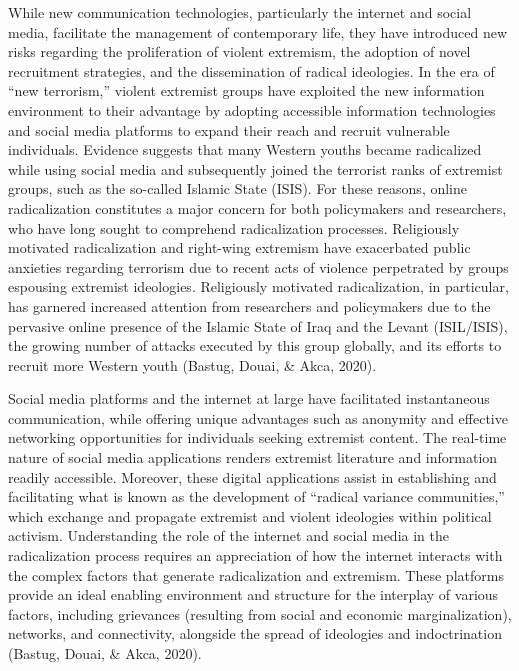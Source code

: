 \documentclass[10pt]{NSP1}
\begin{document}
	While new communication technologies, particularly the internet and social media, facilitate the management of contemporary life, they have introduced new risks regarding the proliferation of violent extremism, the adoption of novel recruitment strategies, and the dissemination of radical ideologies. In the era of ``new terrorism,'' violent extremist groups have exploited the new information environment to their advantage by adopting accessible information technologies and social media platforms to expand their reach and recruit vulnerable individuals. Evidence suggests that many Western youths became radicalized while using social media and subsequently joined the terrorist ranks of extremist groups, such as the so-called Islamic State (ISIS). For these reasons, online radicalization constitutes a major concern for both policymakers and researchers, who have long sought to comprehend radicalization processes. Religiously motivated radicalization and right-wing extremism have exacerbated public anxieties regarding terrorism due to recent acts of violence perpetrated by groups espousing extremist ideologies. Religiously motivated radicalization, in particular, has garnered increased attention from researchers and policymakers due to the pervasive online presence of the Islamic State of Iraq and the Levant (ISIL/ISIS), the growing number of attacks executed by this group globally, and its efforts to recruit more Western youth (Bastug, Douai, \& Akca, 2020).
	
	Social media platforms and the internet at large have facilitated instantaneous communication, while offering unique advantages such as anonymity and effective networking opportunities for individuals seeking extremist content. The real-time nature of social media applications renders extremist literature and information readily accessible. Moreover, these digital applications assist in establishing and facilitating what is known as the development of ``radical variance communities,'' which exchange and propagate extremist and violent ideologies within political activism. Understanding the role of the internet and social media in the radicalization process requires an appreciation of how the internet interacts with the complex factors that generate radicalization and extremism. These platforms provide an ideal enabling environment and structure for the interplay of various factors, including grievances (resulting from social and economic marginalization), networks, and connectivity, alongside the spread of ideologies and indoctrination (Bastug, Douai, \& Akca, 2020).
	
\end{document}
